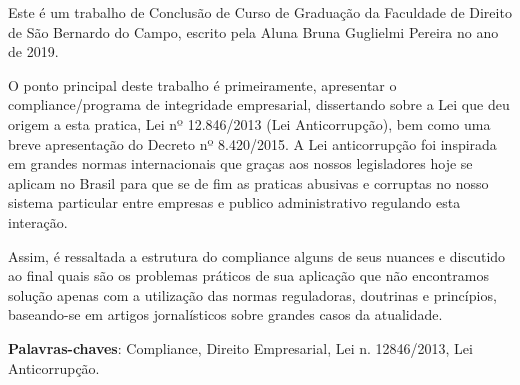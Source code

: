 \setlength{\absparsep}{18pt} %
\begin{resumo}

Este é um trabalho de Conclusão de Curso de Graduação da Faculdade de Direito de São Bernardo do Campo, escrito pela Aluna Bruna Guglielmi Pereira no ano de 2019. 

O ponto principal deste trabalho é primeiramente, apresentar o compliance/programa de integridade empresarial, dissertando sobre a Lei que deu origem a esta pratica, Lei nº 12.846/2013 (Lei Anticorrupção), bem como uma breve apresentação do Decreto nº 8.420/2015. A Lei anticorrupção foi inspirada em grandes normas internacionais que graças aos nossos legisladores hoje se aplicam no Brasil para que se de fim as praticas abusivas e corruptas no nosso sistema particular entre empresas e publico administrativo regulando esta interação. 

Assim, é ressaltada a estrutura do compliance alguns de seus nuances e discutido ao final quais são os problemas práticos de sua aplicação que não encontramos solução apenas com a utilização das normas reguladoras, doutrinas e princípios, baseando-se em artigos jornalísticos sobre grandes casos da atualidade. 

\textbf{Palavras-chaves}: Compliance, Direito Empresarial, Lei n. 12846/2013, Lei Anticorrupção.
\end{resumo}